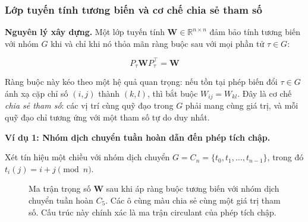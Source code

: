 \subsubsection{Lớp tuyến tính tương biến và cơ chế chia sẻ tham số}
\label{subsubsec:linear-equivariant}

\textbf{Nguyên lý xây dựng.} Một lớp tuyến tính $\mathbf{W} \in \mathbb{R}^{n \times n}$ đảm bảo tính tương biến với nhóm $G$ khi và chỉ khi nó thỏa mãn ràng buộc sau với mọi phần tử $\tau \in G$:

\begin{equation}
    P_\tau \mathbf{W} P_\tau^\top = \mathbf{W}
    \label{eq:equivariance-constraint}
\end{equation}

Ràng buộc này kéo theo một hệ quả quan trọng: nếu tồn tại phép biến đổi $\tau \in G$ ánh xạ cặp chỉ số $(i,j)$ thành $(k,l)$, thì bắt buộc $W_{ij} = W_{kl}$. Đây là cơ chế \textit{chia sẻ tham số}: các vị trí cùng quỹ đạo trong $G$ phải mang cùng giá trị, và mỗi quỹ đạo chỉ tương ứng với một tham số tự do duy nhất.

\vspace{0.5em}
\textbf{Ví dụ 1: Nhóm dịch chuyển tuần hoàn dẫn đến phép tích chập.}

Xét tín hiệu một chiều với nhóm dịch chuyển $G = C_n = \{t_0, t_1, \ldots, t_{n-1}\}$, trong đó $t_i(j) = i + j \pmod{n}$.

\begin{figure}[H]
\centering
{}
\caption{Ma trận trọng số $\mathbf{W}$ sau khi áp ràng buộc tương biến với nhóm dịch chuyển tuần hoàn $C_5$. Các ô cùng màu chia sẻ cùng một giá trị tham số. Cấu trúc này chính xác là ma trận circulant của phép tích chập.}
\label{fig:circulant-matrix}
\end{figure}

